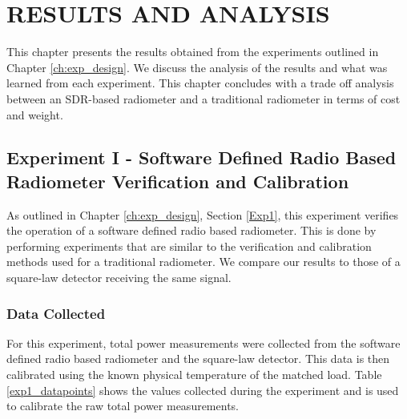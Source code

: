 


\chapter{RESULTS AND ANALYSIS}\label{ch:results}
This chapter presents the results obtained from the experiments outlined in Chapter \ref{ch:exp_design}.  We discuss the analysis of the results and what was learned from each experiment.  This chapter concludes with a trade off analysis between an SDR-based radiometer and a traditional radiometer in terms of cost and weight.

\section{Experiment I - Software Defined Radio Based Radiometer Verification and Calibration} \label{Exp1_results}
As outlined in Chapter \ref{ch:exp_design}, Section \ref{Exp1}, this experiment verifies the operation of a software defined radio based radiometer.  This is done by performing experiments that are similar to the verification and calibration methods used for a traditional radiometer.  We compare our results to those of a square-law detector receiving the same signal.

\subsection{Data Collected}\label{Exp1_data}

For this experiment, total power measurements were collected from the software defined radio based radiometer and the square-law detector.  This data is then calibrated using the known physical temperature of the matched load.  Table \ref{exp1_datapoints} shows the values collected during the experiment and is used to calibrate the raw total power measurements.


